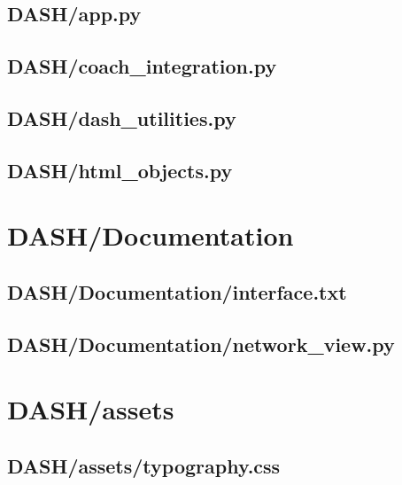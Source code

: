 \documentclass{article}
\begin{document}
\subsection[app.py]{DASH/app.py}

\newpage

\subsection[coach\_integration.py]{DASH/coach\_integration.py}

\newpage

\subsection[dash\_utilities.py]{DASH/dash\_utilities.py}

\newpage

\subsection[html\_objects.py]{DASH/html\_objects.py}

\newpage

\section{DASH/Documentation}
\subsection[interface.txt]{DASH/Documentation/interface.txt}

\newpage

\subsection[network\_view.py]{DASH/Documentation/network\_view.py}

\newpage

\section{DASH/assets}
\subsection[typography.css]{DASH/assets/typography.css}

\newpage
\end{document}
